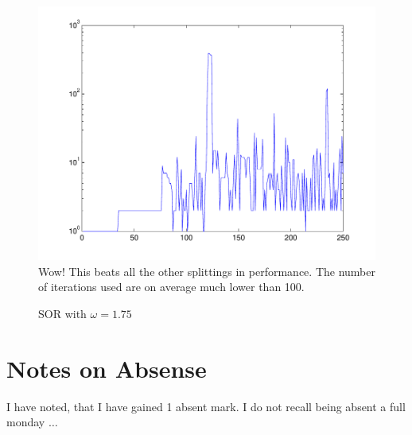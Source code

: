 \documentclass[10pt,oneside,a4paper,final,english]{memoir}
\begin{document}
\begin{figure}[h]
\caption{SOR with $\omega = 1.75$}
\includegraphics[width=\textwidth]{images/sor_high.pdf}
Wow! This beats all the other splittings in performance. The number of
iterations used are on average much lower than 100.
\end{figure}

\section{Notes on Absense}
I have noted, that I have gained 1 absent mark. I do not recall being
absent a full monday $\ldots$
\end{document}
